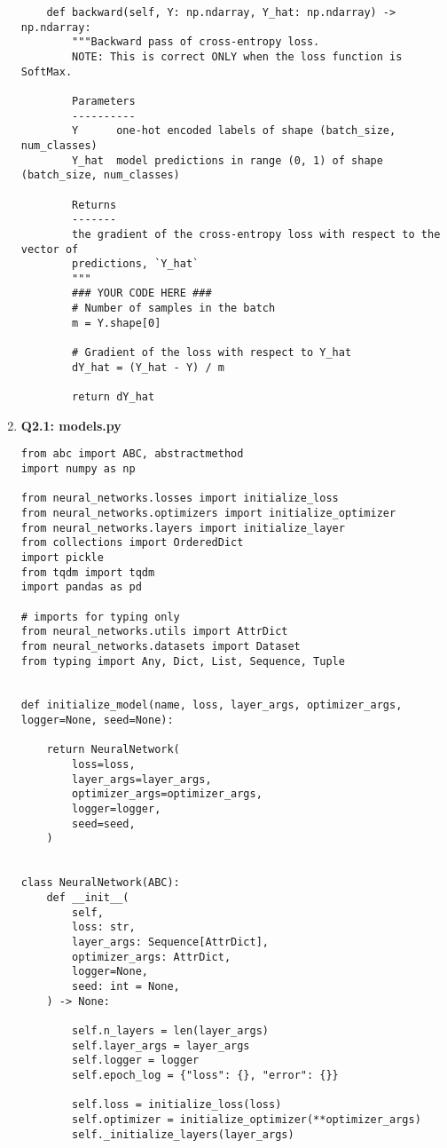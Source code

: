 \documentclass{article}
\begin{document}
\begin{enumerate}
\begin{verbatim}
    def backward(self, Y: np.ndarray, Y_hat: np.ndarray) -> np.ndarray:
        """Backward pass of cross-entropy loss.
        NOTE: This is correct ONLY when the loss function is SoftMax.

        Parameters
        ----------
        Y      one-hot encoded labels of shape (batch_size, num_classes)
        Y_hat  model predictions in range (0, 1) of shape (batch_size, num_classes)

        Returns
        -------
        the gradient of the cross-entropy loss with respect to the vector of
        predictions, `Y_hat`
        """
        ### YOUR CODE HERE ###
        # Number of samples in the batch
        m = Y.shape[0]

        # Gradient of the loss with respect to Y_hat
        dY_hat = (Y_hat - Y) / m

        return dY_hat
\end{verbatim}\newpage

    \item 
     \textbf{Q2.1: models.py}
\begin{verbatim}
from abc import ABC, abstractmethod
import numpy as np

from neural_networks.losses import initialize_loss
from neural_networks.optimizers import initialize_optimizer
from neural_networks.layers import initialize_layer
from collections import OrderedDict
import pickle
from tqdm import tqdm
import pandas as pd

# imports for typing only
from neural_networks.utils import AttrDict
from neural_networks.datasets import Dataset
from typing import Any, Dict, List, Sequence, Tuple


def initialize_model(name, loss, layer_args, optimizer_args, logger=None, seed=None):

    return NeuralNetwork(
        loss=loss,
        layer_args=layer_args,
        optimizer_args=optimizer_args,
        logger=logger,
        seed=seed,
    )


class NeuralNetwork(ABC):
    def __init__(
        self,
        loss: str,
        layer_args: Sequence[AttrDict],
        optimizer_args: AttrDict,
        logger=None,
        seed: int = None,
    ) -> None:

        self.n_layers = len(layer_args)
        self.layer_args = layer_args
        self.logger = logger
        self.epoch_log = {"loss": {}, "error": {}}

        self.loss = initialize_loss(loss)
        self.optimizer = initialize_optimizer(**optimizer_args)
        self._initialize_layers(layer_args)


\end{verbatim}
\end{enumerate}
\end{document}
